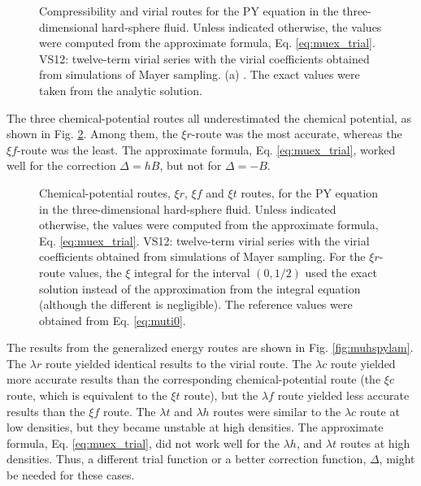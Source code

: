 \documentclass[aip,jcp,reprint,superscriptaddress]{revtex4-1}
\begin{document}
\begin{figure}[h]
  \caption{
    \label{fig:muhspycv}
    Compressibility and virial routes
    for the PY equation
    in the three-dimensional hard-sphere fluid.
    Unless indicated otherwise,
    the values were computed
    from the approximate formula,
    Eq. \eqref{eq:muex_trial}.
    VS12: twelve-term virial series
    with the virial coefficients obtained
    from simulations of Mayer sampling\cite{
    schultz2014}.
    (a) .
    The exact values were taken from
    the analytic solution\cite{
    wertheim1963, wertheim1964, thiele1963,
    baxter1968, hansen}.
  }
\end{figure}



The three chemical-potential routes
all underestimated the chemical potential,
as shown in Fig. \ref{fig:muhspyxi}.
%
Among them,
the $\xi r$-route was the most accurate,
whereas the $\xi f$-route was the least.
%
The approximate formula,
Eq. \eqref{eq:muex_trial},
worked well for the correction
$\Delta = h B$,
but not for $\Delta = -B$.



\begin{figure}[h]
  \caption{
    \label{fig:muhspyxi}
    Chemical-potential routes,
    $\xi r$, $\xi f$ and $\xi t$ routes,
    for the PY equation
    in the three-dimensional hard-sphere fluid.
    Unless indicated otherwise,
    the values were computed
    from the approximate formula,
    Eq. \eqref{eq:muex_trial}.
    VS12: twelve-term virial series
    with the virial coefficients obtained
    from simulations of Mayer sampling\cite{
    schultz2014}.
    For the $\xi r$-route values,
    the $\xi$ integral
    for the interval $(0, 1/2)$
    used the exact solution\cite{
    santos2012, santos2013}
    instead of the approximation
    from the integral equation
    (although the different is negligible).
    The reference values were obtained
    from Eq. \eqref{eq:muti0}.
  }
\end{figure}





The results from
the generalized energy routes
are shown in Fig. \ref{fig:muhspylam}.
%
The $\lambda r$ route
yielded identical results to the virial route.
%
The $\lambda c$ route
yielded more accurate results than
the corresponding chemical-potential route
(the $\xi c$ route,
which is equivalent to the $\xi t$ route),
but the $\lambda f$ route
yielded less accurate results than
the $\xi f$ route.
%
The $\lambda t$ and $\lambda h$ routes
were similar to the $\lambda c$ route
at low densities,
but they became unstable at high densities.
%
The approximate formula,
Eq. \eqref{eq:muex_trial},
did not work well
for the $\lambda h$, and $\lambda t$
routes at high densities.
%
Thus, a different trial function
or a better correction function, $\Delta$,
might be needed for these cases.
\end{document}
